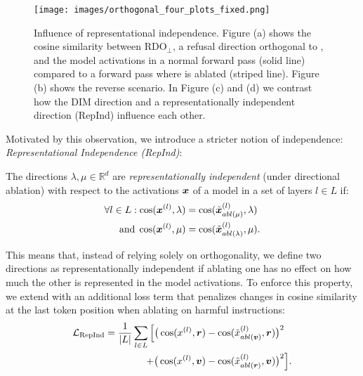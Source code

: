 \begin{figure}[t!]
    \centering
    \texttt{[image: images/orthogonal\_four\_plots\_fixed.png]}
    \vspace{-10pt}
    \caption{Influence of representational independence. Figure (a) shows the cosine similarity between $\text{RDO}_\perp$, a refusal direction orthogonal to \dimacro, and the model activations in a normal forward pass (solid line) compared to a forward pass where \dimacro is ablated (striped line). Figure (b) shows the reverse scenario. In Figure (c) and (d) we contrast how the DIM direction and a representationally independent direction (RepInd) influence each other.}
    
    \label{fig:orthogonal-effects}
\end{figure}
Motivated by this observation, we introduce a stricter notion of independence: \emph{Representational Independence (RepInd)}:
\begin{definition}
The directions $\lambda, \mu \in \mathbb{R}^d$ are \textit{representationally independent} (under directional ablation) with respect to the activations ${\bm{x}}$ of a model in a set of layers $l \in L$ if:
    \begin{equation*}
    \begin{split}
    \forall l \in L: \cos({\bm{x}}^{(l)}, \lambda) &= \cos(\tilde{{\bm{x}}}^{(l)}_{abl(\mu)}, \lambda)  \\ 
    \text{and}\;
    \cos({\bm{x}}^{(l)}, \mu) &= \cos(\tilde{{\bm{x}}}^{(l)}_{abl(\lambda)}, \mu).
    \end{split}
    \end{equation*}
\end{definition}
This means that, instead of relying solely on orthogonality, we define two directions as representationally independent if ablating one has no effect on how much the other is represented in the model activations. To enforce this property, we extend  with an additional loss term that penalizes changes in cosine similarity at the last token position when ablating on harmful instructions:
\begin{equation*}
\begin{split}
\mathcal{L}_{\text{RepInd}} = \frac{1}{|L|} \sum_{l \in L} \Big[ \big(\cos(x^{(l)}, {{\bm{r}}}) &- \cos(\tilde{x}^{(l)}_{abl({{\bm{v}}})}, {{\bm{r}}})\big)^2 \\+ \big(\cos(x^{(l)}, {{\bm{v}}}) &- \cos(\tilde{x}^{(l)}_{abl({{\bm{r}}})}, {{\bm{v}}})\big)^2 \Big].
\end{split}
\end{equation*}


